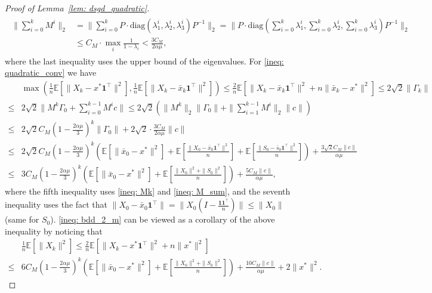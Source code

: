 \documentclass{article}
\theoremstyle{plain}
\theoremstyle{definition}
\theoremstyle{remark}
\newcommand{\E}{\mathbb{E}}
\newcommand{\bfone}{\mathbf{1}}
\newcommand{\bfonet}{\mathbf{1}^{\top}}
\begin{document}
\begin{proof}[Proof of Lemma~\ref{lem: dsgd_quadratic}]
    \begin{align}\label{ineq: M_sum}
    \begin{aligned}
        \|\sum_{i=0}^{k}M^i\|_2 &= \|\sum_{i=0}^{k}P\cdot \text{diag}(\lambda_1^i, \lambda_2^i, \lambda_3^i)P^{-1}\|_2 = \|P\cdot \text{diag}\left(\sum_{i=0}^{k}\lambda_1^i, \sum_{i=0}^{k}\lambda_2^i, \sum_{i=0}^{k}\lambda_3^i\right)P^{-1}\|_2\\
        &\leq C_M\cdot \max_i \frac{1}{1-\lambda_i} < \frac{3C_M}{2\alpha\mu},
    \end{aligned}
    \end{align}
    where the last inequality uses the upper bound of the eigenvalues. For \eqref{ineq: quadratic_conv} we have
    \begin{align*}
        &\max\left(\frac{1}{n}\E\left[\|X_k - x^*\bfonet\|^2\right], \frac{1}{n}\E\left[\|X_k-\bar{x}_k\bfonet\|^2\right]\right) \leq \frac{2}{n}\E\left[\|X_k -\bar{x}_k\bfonet\|^2 + n\|\bar{x}_k - x^*\|^2\right]\leq 2\sqrt{2}\|\Gamma_k\| \\
        \leq &2\sqrt{2}\|M^k\Gamma_0 + \sum_{i=0}^{k-1}M^ic\|\leq 2\sqrt{2}(\|M^k\|_2\|\Gamma_0\| + \|\sum_{i=1}^{k-1}M^i\|_2\|c\|) \\
        \leq &2\sqrt{2}C_M\left(1-\frac{2\alpha\mu}{3}\right)^k\|\Gamma_0\| + 2\sqrt{2}\cdot\frac{3C_M}{2\alpha\mu}\|c\| \\
        \leq & 2\sqrt{2}C_M\left(1-\frac{2\alpha\mu}{3}\right)^k(\E\left[\|\bar{x}_0 - x^*\|^2\right] + \E\left[\frac{\|X_0-\bar{x}_0\bfonet\|^2}{n}\right] + \E\left[\frac{\|S_0 - \bar{s}_0\bfonet\|^2}{n}\right]) + \frac{3\sqrt{2}C_M\|c\|}{\alpha\mu} \\
        \leq &3C_M\left(1-\frac{2\alpha\mu}{3}\right)^k\left(\E\left[\|\bar{x}_0 - x^*\|^2\right] + \E\left[\frac{\|X_0\|^2 + \|S_0\|^2}{n}\right]\right) + \frac{5C_M\|c\|}{\alpha\mu},
    \end{align*}
    where the fifth inequality uses \eqref{ineq: Mk} and \eqref{ineq: M_sum}, and the seventh inequality uses the fact that $\|X_0-\bar{x}_0\bfonet\| = \|X_0\left(I - \frac{\bfone\bfonet}{n}\right)\|\leq \|X_0\|$ (same for $S_0$). \eqref{ineq: bdd_2_m} can be viewed as a corollary of the above inequality by noticing that
    \begin{align*}
        &\frac{1}{n}\E\left[\|X_k\|^2\right]\leq \frac{2}{n}\E\left[\|X_k - x^*\bfonet\|^2 + n\|x^*\|^2\right] \\
        \leq &6C_M\left(1-\frac{2\alpha\mu}{3}\right)^k\left(\E\left[\|\bar{x}_0 - x^*\|^2\right] + \E\left[\frac{\|X_0\|^2 + \|S_0\|^2}{n}\right]\right) + \frac{10C_M\|c\|}{\alpha\mu} + 2\|x^*\|^2.
    \end{align*}
\end{proof}
\end{document}
